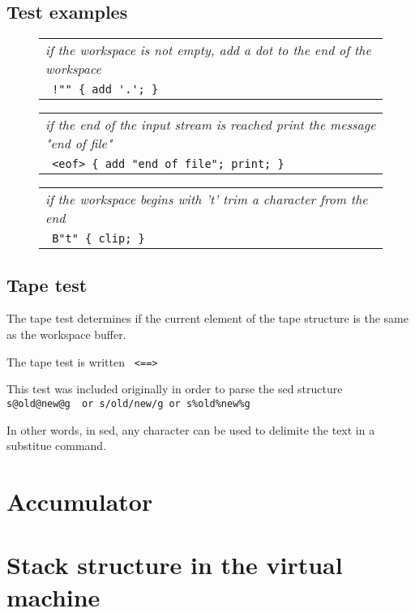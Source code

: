 \documentclass[a4paper,12pt]{article}
\begin{document}
\subsection{Test examples}
 \begin{figure}
 \begin{tabular}{ l }
 \emph{ if the workspace is not empty, add a dot to the end of the workspace } \\ 
 \verb| !"" { add '.'; } |
 \end{tabular} 
 \end{figure}
 \begin{figure}
 \begin{tabular}{ l }
 \emph{ if the end of the input stream is reached print the message "end of file" } \\ 
 \verb| <eof> { add "end of file"; print; } |
 \end{tabular} 
 \end{figure}
 \begin{figure}
 \begin{tabular}{ l }
 \emph{ if the workspace begins with 't' trim a character from the end } \\ 
 \verb| B"t" { clip; } |
 \end{tabular} 
 \end{figure}

\subsection{Tape test}

 The tape test determines if the current element of the tape structure is the
 same as the workspace buffer.

 The tape test is written 
 \verb| <==> |


 This test was included originally in order to parse the sed structure 
 \verb| s@old@new@g  or s/old/new/g or s%old%new%g |

 In other words, in sed, any character can be used to delimite the
 text in a substitue command.

\section{Accumulator}

\section{Stack structure in the virtual machine}
\end{document}
